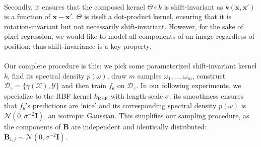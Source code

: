 \documentclass[11pt]{article}
\newcommand{\X}{\mathcal{X}}
\newcommand{\Y}{\mathcal{Y}}
\begin{document}
\\
Secondly, it ensures that the composed kernel $\Theta \circ k$ is shift-invariant as $k(\mathbf{x}, \mathbf{x}')$ is a function of $\mathbf{x} - \mathbf{x}'$. $\Theta$ is itself a dot-product kernel, ensuring that it is rotation-invariant but not necessarily shift-invariant. However, for the sake of pixel regression, we would like to model all components of an image regardless of position; thus shift-invariance is a key property.\\
\\
Our complete procedure is this: we pick some parameterized shift-invariant kernel $k$, find its spectral density $p(\omega)$, draw $m$ samples $\omega_1, \dots, \omega_m$, construct $\mathcal{D}_\gamma = \{\gamma(\X), \Y\}$ and then train $f_\theta$ on $\mathcal{D}_\gamma$. In our following experiments, we specialize to the RBF kernel $k_{\text{RBF}}$ with length-scale $\sigma$: its smoothness ensures that $f_\theta$'s predictions are `nice' and its corresponding spectral density $p(\omega)$ is $\mathcal{N}(0, \sigma^{-2}\mathbf{I})$, an isotropic Gaussian. This simplifies our sampling procedure, as the components of $\mathbf{B}$ are independent and identically distributed: $\mathbf{B}_{i, j} \sim \mathcal{N}(0, \sigma^{-2}\mathbf{I})$.
\end{document}
